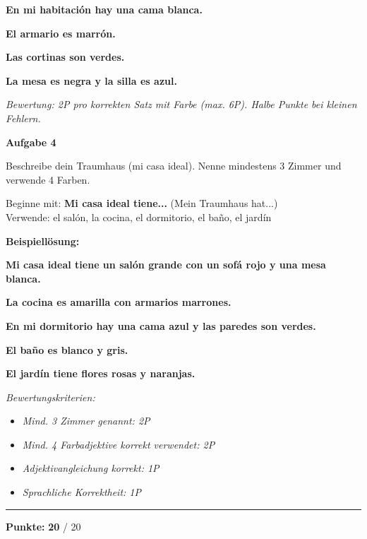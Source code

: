 \documentclass[11pt, a4paper]{article}
\newcommand{\fachfarbe}{spanisch}
\newcommand{\maxpunkte}{20}
\newcommand{\punktebox}[1]{\hfill\fbox{\small \_/#1}}
\newcommand{\loesung}[1]{\textcolor{loesung}{\textbf{#1}}}
\newenvironment{aufgabe}[1]{%
    \needspace{5\baselineskip}%
    \nopagebreak[4]%
    \vspace{10pt}
    \noindent\textbf{\textcolor{\fachfarbe}{Aufgabe #1}}
    \nopagebreak[4]%
    \vspace{5pt}
    \nopagebreak[4]%
    \begin{list}{}{\leftmargin=0pt}
    \item[]
}{%
    \end{list}
}
\newcommand{\es}[1]{\textcolor{\fachfarbe}{\textbf{#1}}}
\begin{document}
\loesung{En mi habitación hay una cama blanca.}

\loesung{El armario es marrón.}

\loesung{Las cortinas son verdes.}

\loesung{La mesa es negra y la silla es azul.}

\vspace{0.5em}

\textit{\textcolor{grau}{Bewertung: 2P pro korrekten Satz mit Farbe (max. 6P). Halbe Punkte bei kleinen Fehlern.}}

\vspace{15pt}


\begin{aufgabe}{4}
Beschreibe dein Traumhaus (mi casa ideal). Nenne mindestens 3 Zimmer und verwende 4 Farben. \punktebox{6}
\end{aufgabe}

\begin{hinweis}
Beginne mit: \es{Mi casa ideal tiene...} (Mein Traumhaus hat...)\\
Verwende: el salón, la cocina, el dormitorio, el baño, el jardín
\end{hinweis}

\vspace{0.5em}

\noindent
\textbf{Beispiellösung:}

\loesung{Mi casa ideal tiene un salón grande con un sofá rojo y una mesa blanca.}

\loesung{La cocina es amarilla con armarios marrones.}

\loesung{En mi dormitorio hay una cama azul y las paredes son verdes.}

\loesung{El baño es blanco y gris.}

\loesung{El jardín tiene flores rosas y naranjas.}

\vspace{0.5em}

\textit{\textcolor{grau}{Bewertungskriterien:}}
\begin{itemize}[topsep=0pt,itemsep=0pt]
    \item \textit{\textcolor{grau}{Mind. 3 Zimmer genannt: 2P}}
    \item \textit{\textcolor{grau}{Mind. 4 Farbadjektive korrekt verwendet: 2P}}
    \item \textit{\textcolor{grau}{Adjektivangleichung korrekt: 1P}}
    \item \textit{\textcolor{grau}{Sprachliche Korrektheit: 1P}}
\end{itemize}


\vspace{20pt}
\hrule
\vspace{10pt}

\begin{flushright}
\textbf{Punkte:} \loesung{\maxpunkte} / \maxpunkte
\end{flushright}
\end{document}

